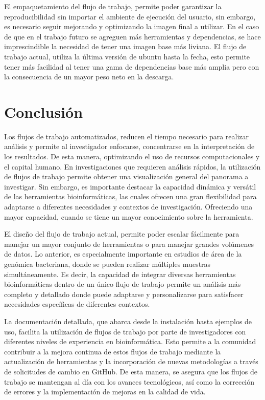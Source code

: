 \documentclass[12pt]{article}
\begin{document}
El empaquetamiento del flujo de trabajo, permite poder garantizar la 
reproducibilidad sin importar el ambiente de ejecución del usuario, sin embargo, 
es necesario seguir mejorando y optimizando la imagen final a utilizar. En el caso 
de que en el trabajo futuro se agreguen más herramientas y dependencias, se hace 
imprescindible la necesidad de tener una imagen base más liviana. El flujo de trabajo 
actual, utiliza la última versión de ubuntu hasta la fecha, esto permite tener más 
facilidad al tener una gama de dependencias base más amplia pero con la consecuencia 
de un mayor peso neto en la descarga. 


\newpage
\section{Conclusión}
Los flujos de trabajo automatizados, reducen el tiempo necesario 
para realizar análisis y permite al investigador enfocarse, 
concentrarse en la interpretación de los resultados. De esta manera, 
optimizando el uso de recursos computacionales y el capital humano. 
En investigaciones que requieren análisis rápidos, la utilización de 
flujos de trabajo permite obtener una visualización general del 
panorama a investigar. Sin embargo, es importante destacar la 
capacidad dinámica y versátil de las herramientas bioinformáticas, 
las cuales ofrecen una gran flexibilidad para adaptarse a diferentes 
necesidades y contextos de investigación. Ofreciendo una mayor 
capacidad, cuando se tiene un mayor conocimiento sobre la herramienta.


El diseño del flujo de trabajo actual, permite poder escalar 
fácilmente para manejar un mayor conjunto de herramientas o para 
manejar grandes volúmenes de datos. Lo anterior, es especialmente 
importante en estudios de área de la genómica bacteriana, donde se 
pueden realizar múltiples muestras simultáneamente. Es decir, la 
capacidad de integrar diversas herramientas bioinformáticas dentro 
de un único flujo de trabajo permite un análisis más completo y 
detallado donde puede adaptarse y personalizarse para satisfacer 
necesidades específicas de diferentes contextos. 

La documentación detallada, que abarca desde la instalación 
hasta ejemplos de uso, facilita la utilización de flujos de trabajo 
por parte de investigadores con diferentes niveles de experiencia en 
bioinformática. Esto permite a la comunidad contribuir a la mejora 
continua de estos flujos de trabajo mediante la actualización de 
herramientas y la incorporación de nuevas metodologías a través de 
solicitudes de cambio en GitHub. De esta manera, se asegura que los 
flujos de trabajo se mantengan al día con los avances tecnológicos, 
así como la corrección de errores y la implementación de mejoras en 
la calidad de vida.
\end{document}
